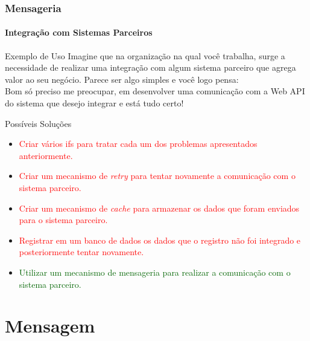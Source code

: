 \documentclass[
	9pt, %
	t, %
]{beamer}
\begin{document}
\begin{frame}
	\frametitle{Mensageria}
	\framesubtitle{Integração com Sistemas Parceiros}

	\begin{block}{Exemplo de Uso}
		Imagine que na organização na qual você trabalha, surge a necessidade de realizar uma integração com algum sistema parceiro que agrega valor ao seu negócio. Parece ser algo simples e você logo pensa:
		\\ \bigskip
		\alert{Bom só preciso me preocupar, em desenvolver uma comunicação com a Web API do sistema que desejo integrar e está tudo certo!}

	\end{block}
	
	\begin{exampleblock}{Possíveis Soluções}
		\begin{itemize}
			\item \textcolor{red}{Criar vários ifs para tratar cada um dos problemas apresentados anteriormente.}
			\item \textcolor{red}{Criar um mecanismo de \textit{retry} para tentar novamente a comunicação com o sistema parceiro.}
			\item \textcolor{red}{Criar um mecanismo de \textit{cache} para armazenar os dados que foram enviados para o sistema parceiro.}
			\item \textcolor{red}{Registrar em um banco de dados os dados que o registro não foi integrado e posteriormente tentar novamente.}
			\item \textcolor{darkgreen}{Utilizar um mecanismo de mensageria para realizar a comunicação com o sistema parceiro.}
		\end{itemize}
	\end{exampleblock}

\end{frame}

\section{Mensagem}
\end{document}
